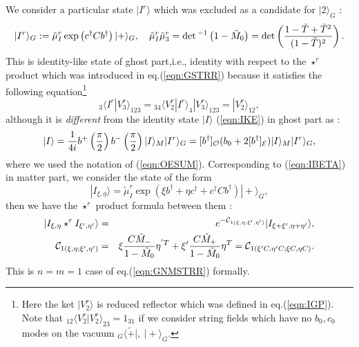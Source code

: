 \documentclass[12pt,a4paper]{article}
\def\T{{\tilde T}}
\def\M0{{\tilde M}_0}
\def\Mp{{\tilde M}_+}
\def\Mm{{\tilde M}_-}
\def\tm{{\tilde \mu}}
\begin{document}
We consider a particular state $|I^r\rangle$ which was excluded as a candidate for $|2\rangle_G$ :
\begin{eqnarray}
|I^r\rangle_G:=\tm_I^r\exp\left(c^\dagger C b^\dagger\right)|+\rangle_G,\ \ \ 
\tm_I^r \tm_3^r=\det{}^{-1}\left(1-\M0 \right)=\det\left({1-\T+\T^2\over(1-\T )^2}\right).
\end{eqnarray}
This is identity-like state of ghost part,i.e., identity with respect to the $\star^r$ product which was introduced in eq.(\ref{eqn:GSTRR}) because it satisfies the following equation\footnote{
Here the ket $|V_2^r\rangle$ is reduced reflector which was defined in eq.(\ref{eqn:IGP}). Note that ${}_{12}\langle V_2^r|V_2^r\rangle_{23}=1_{31}$ if we consider string fields which have no $b_0,c_0$ modes on the vacuum ${}_G\langle{\tilde +}|,\ |+\rangle_G$.
}
\begin{equation}
{}_3\langle I^r|V_3^r\rangle_{123}= {}_{34}\langle V_2^r|I^r\rangle_4 |V_3^r\rangle_{123}= |V_2^r\rangle_{12},
\end{equation}
although it is {\it different} from the identity state $|I\rangle$ (\ref{eqn:IKE}) in ghost part as :
\begin{equation}
|I\rangle={1\over4i}b^+\left({\pi\over2}\right)b^-\left({\pi\over2}\right)|I\rangle_M|I^r\rangle_G=[b^\dagger]_{\cal O} (b_0+2 [b^\dagger]_{\cal E}) |I\rangle_M|I^r\rangle_G,
\end{equation}
where we used the notation of (\ref{eqn:OESUM}).
Corresponding to  (\ref{eqn:IBETA}) in matter part, we consider the state of the form
\begin{equation}
|I_{\xi,\eta}\rangle=\tm_I^r\exp\left(\xi b^\dagger+\eta c^\dagger+c^\dagger Cb^\dagger\right)|+\rangle_G,
\end{equation}
then we have the $\star^r$ product formula between them :
\begin{eqnarray}
|I_{\xi,\eta}\star^rI_{\xi',\eta'}\rangle&=&e^{-{\cal C}_{1(\xi,\eta;\xi',\eta')}}|I_{\xi+\xi',\eta+\eta'}\rangle,\nonumber \\
{\cal C}_{1(\xi,\eta;\xi',\eta')}&=&\xi{C\Mm \over1-\M0 }\eta^{'T }+\xi'{C\Mp \over1-\M0 }\eta^T={\cal C}_{1(\xi'C,\eta'C;\xi C,\eta C)}.
\end{eqnarray}
This is $n=m=1$ case of eq.(\ref{eqn:GNMSTRR}) formally.\\
\end{document}
